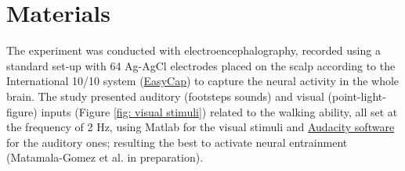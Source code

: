 \section{Materials}
The experiment was conducted with electroencephalography, recorded using a standard set-up with 64 Ag-AgCl electrodes placed on the scalp according to the International 10/10 system (\href{https://www.easycap.de/}{EasyCap}) to capture the neural activity in the whole brain. 
The study presented auditory (footsteps sounds) and visual (point-light-figure) inputs (Figure \ref{fig: visual stimuli}) related to the walking ability, all set at the frequency of 2 Hz, using Matlab for the visual stimuli and \href{https://www.audacityteam.org/}{Audacity software} for the auditory ones; resulting the best to activate neural entrainment (Matamala-Gomez et al. in preparation).

